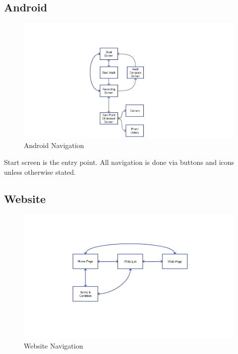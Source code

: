 \documentclass[12pt]{article}
\begin{document}
\subsection{Android}
\begin{figure}[htp]
\begin{adjustwidth}{-3.cm}{-4cm}
\centering
\includegraphics[scale=0.6]{Project_Plan/docs/android_navigation_01.png}
\caption{Android Navigation}
\label{Android Navigation}
\end{adjustwidth}
\end{figure}
\par{Start screen is the entry point. All navigation is done via buttons and icons unless otherwise stated.}
\clearpage
\subsection{Website}
\begin{figure}[htp]
\begin{adjustwidth}{-3cm}{-3cm}
\centering
\includegraphics[scale=0.6]{Project_Plan/docs/website_navigation_01.png}

\caption{Website Navigation}
\label{Website Navigation}
\end{adjustwidth}
\end{figure}
\end{document}
